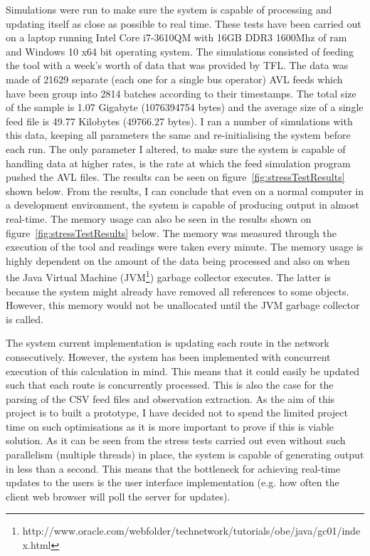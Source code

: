 Simulations were run to make sure the system is capable of processing and updating itself as close as possible to real time. These tests have been carried out on a laptop running Intel Core i7-3610QM with 16GB DDR3 1600Mhz of ram and Windows 10 x64 bit operating system. The simulations consisted of feeding the tool with a week's worth of data that was provided by TFL. The data was made of 21629 separate (each one for a single bus operator) AVL feeds which have been group into 2814 batches according to their timestamps. The total size of the sample is 1.07 Gigabyte (1076394754 bytes) and the average size of a single feed file is 49.77 Kilobytes (49766.27 bytes). I ran a number of simulations with this data, keeping all parameters the same and re-initialising the system before each run. The only parameter I altered, to make sure the system is capable of handling data at higher rates, is the rate at which the feed simulation program pushed the AVL files. The results can be seen on figure~\ref{fig:stressTestResults} shown below. From the results, I can conclude that even on a normal computer in a development environment, the system is capable of producing output in almost real-time. The memory usage can also be seen in the results shown on figure~\ref{fig:stressTestResults} below. The memory was measured through the execution of the tool and readings were taken every minute. The memory usage is highly dependent on the amount of the data being processed and also on when the Java Virtual Machine (JVM\footnote{http://www.oracle.com/webfolder/technetwork/tutorials/obe/java/gc01/index.html}) garbage collector executes. The latter is because the system might already have removed all references to some objects. However, this memory would not be unallocated until the JVM garbage collector is called.

The system current implementation is updating each route in the network consecutively. However, the system has been implemented with concurrent execution of this calculation in mind. This means that it could easily be updated such that each route is concurrently processed. This is also the case for the parsing of the CSV feed files and observation extraction. As the aim of this project is to built a prototype, I have decided not to spend the limited project time on such optimisations as it is more important to prove if this is viable solution. As it can be seen from the stress tests carried out even without such parallelism (multiple threads) in place, the system is capable of generating output in less than a second. This means that the bottleneck for achieving real-time updates to the users is the user interface implementation (e.g. how often the client web browser will poll the server for updates).

